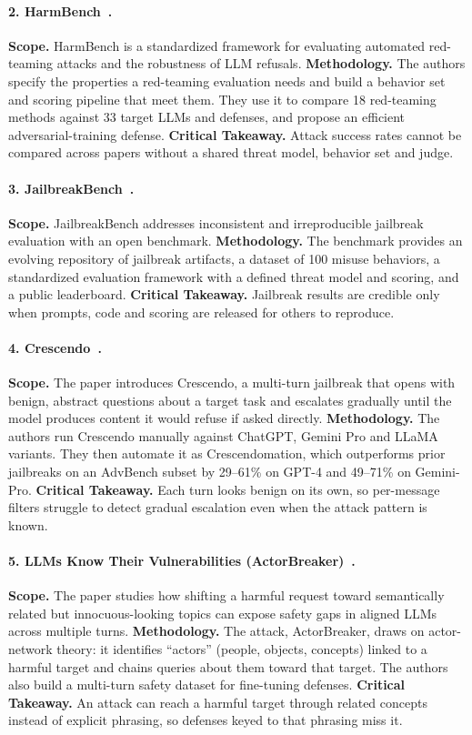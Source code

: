 \documentclass[sigconf,nonacm]{acmart}
\begin{document}
\paragraph{2. HarmBench~\cite{mazeika2024harmbench}.}
\textbf{Scope.} HarmBench is a standardized framework for evaluating automated red-teaming attacks and the robustness of LLM refusals.
\textbf{Methodology.} The authors specify the properties a red-teaming evaluation needs and build a behavior set and scoring pipeline that meet them. They use it to compare 18 red-teaming methods against 33 target LLMs and defenses, and propose an efficient adversarial-training defense.
\textbf{Critical Takeaway.} Attack success rates cannot be compared across papers without a shared threat model, behavior set and judge.

\paragraph{3. JailbreakBench~\cite{chao2024jailbreakbench}.}
\textbf{Scope.} JailbreakBench addresses inconsistent and irreproducible jailbreak evaluation with an open benchmark.
\textbf{Methodology.} The benchmark provides an evolving repository of jailbreak artifacts, a dataset of 100 misuse behaviors, a standardized evaluation framework with a defined threat model and scoring, and a public leaderboard.
\textbf{Critical Takeaway.} Jailbreak results are credible only when prompts, code and scoring are released for others to reproduce.

\paragraph{4. Crescendo~\cite{russinovich2025crescendo}.}
\textbf{Scope.} The paper introduces Crescendo, a multi-turn jailbreak that opens with benign, abstract questions about a target task and escalates gradually until the model produces content it would refuse if asked directly.
\textbf{Methodology.} The authors run Crescendo manually against ChatGPT, Gemini Pro and LLaMA variants. They then automate it as Crescendomation, which outperforms prior jailbreaks on an AdvBench subset by 29--61\% on GPT-4 and 49--71\% on Gemini-Pro.
\textbf{Critical Takeaway.} Each turn looks benign on its own, so per-message filters struggle to detect gradual escalation even when the attack pattern is known.

\paragraph{5. LLMs Know Their Vulnerabilities (ActorBreaker)~\cite{ren2025llms}.}
\textbf{Scope.} The paper studies how shifting a harmful request toward semantically related but innocuous-looking topics can expose safety gaps in aligned LLMs across multiple turns.
\textbf{Methodology.} The attack, ActorBreaker, draws on actor-network theory: it identifies ``actors'' (people, objects, concepts) linked to a harmful target and chains queries about them toward that target. The authors also build a multi-turn safety dataset for fine-tuning defenses.
\textbf{Critical Takeaway.} An attack can reach a harmful target through related concepts instead of explicit phrasing, so defenses keyed to that phrasing miss it.
\end{document}
